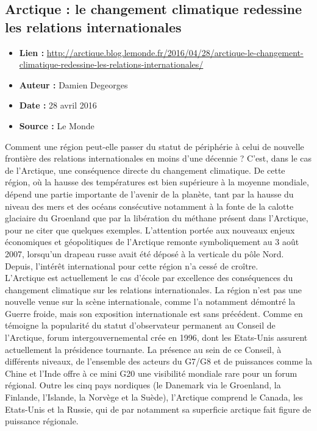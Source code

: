 \documentclass[8pt]{article}
\begin{document}
\subsection{Arctique : le changement climatique redessine les relations internationales}

\begin{itemize}
	\item \textbf{Lien : }  \url{http://arctique.blog.lemonde.fr/2016/04/28/arctique-le-changement-climatique-redessine-les-relations-internationales/} 
	\item \textbf{Auteur : }  Damien Degeorges
	\item \textbf{Date : } 28 avril 2016
	\item \textbf{Source : } Le Monde
\end{itemize}

Comment une région peut-elle passer du statut de périphérie à celui de nouvelle frontière des relations internationales en moins d’une décennie ? C’est, dans le cas de l’Arctique, une conséquence directe du changement climatique. De cette région, où la hausse des températures est bien supérieure à la moyenne mondiale, dépend une partie importante de l’avenir de la planète, tant par la hausse du niveau des mers et des océans consécutive notamment à la fonte de la calotte glaciaire du Groenland que par la libération du méthane présent dans l’Arctique, pour ne citer que quelques exemples. L’attention portée aux nouveaux enjeux économiques et géopolitiques de l’Arctique remonte symboliquement au 3 août 2007, lorsqu’un drapeau russe avait été déposé à la verticale du pôle Nord. Depuis, l’intérêt international pour cette région n’a cessé de croître.\\

L’Arctique est actuellement le cas d’école par excellence des conséquences du changement climatique sur les relations internationales. La région n’est pas une nouvelle venue sur la scène internationale, comme l’a notamment démontré la Guerre froide, mais son exposition internationale est sans précédent. Comme en témoigne la popularité du statut d’observateur permanent au Conseil de l’Arctique, forum intergouvernemental crée en 1996, dont les Etats-Unis assurent actuellement la présidence tournante. La présence au sein de ce Conseil, à différents niveaux, de l’ensemble des acteurs du G7/G8 et de puissances comme la Chine et l’Inde offre à ce mini G20 une visibilité mondiale rare pour un forum régional. Outre les cinq pays nordiques (le Danemark via le Groenland, la Finlande, l’Islande, la Norvège et la Suède), l’Arctique comprend le Canada, les Etats-Unis et la Russie, qui de par notamment sa superficie arctique fait figure de puissance régionale.\\
\end{document}
